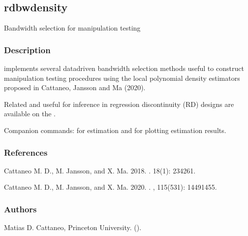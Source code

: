 \documentclass[letterpaper,10pt,english]{sphinxmanual}
\begin{document}
\sphinxstepscope


\subsection{rdbwdensity}
\label{\detokenize{rdbwdensity:rdbwdensity}}\label{\detokenize{rdbwdensity::doc}}
\sphinxAtStartPar
Bandwidth selection for manipulation testing


\subsubsection{Description}
\label{\detokenize{rdbwdensity:description}}
\sphinxAtStartPar
{} implements several data\sphinxhyphen{}driven bandwidth selection methods useful to construct manipulation testing procedures using the local polynomial density estimators proposed in Cattaneo, Jansson and Ma (2020).

\sphinxAtStartPar
Related  and  useful for inference in regression discontinuity (RD) designs are available on the .

\sphinxAtStartPar
Companion commands:  for estimation and  for plotting estimation results.


\subsubsection{References}
\label{\detokenize{rdbwdensity:references}}
\sphinxAtStartPar
Cattaneo M. D., M. Jansson, and X. Ma. 2018.
.
 18(1): 234\sphinxhyphen{}261.

\sphinxAtStartPar
Cattaneo M. D., M. Jansson, and X. Ma. 2020.
.
, 115(531): 1449\sphinxhyphen{}1455.


\subsubsection{Authors}
\label{\detokenize{rdbwdensity:authors}}
\sphinxAtStartPar
Matias D. Cattaneo, Princeton University. ().
\end{document}
